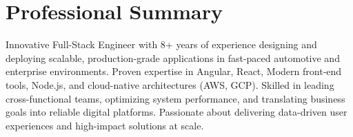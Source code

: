 \vspace{-0.6em}
\section{Professional Summary}
\noindent \normalsize Innovative Full-Stack Engineer with 8+ years of experience designing and deploying scalable, production-grade applications in fast-paced automotive and enterprise environments. Proven expertise in Angular, React, Modern front-end tools, Node.js, and cloud-native architectures (AWS, GCP). Skilled in leading cross-functional teams, optimizing system performance, and translating business goals into reliable digital platforms. Passionate about delivering data-driven user experiences and high-impact solutions at scale.
\nopagebreak[4]